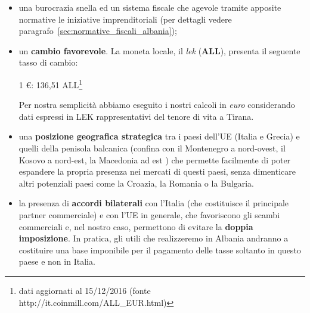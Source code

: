 \begin{itemize}
\item una burocrazia snella ed un sistema fiscale che agevole tramite apposite normative le iniziative imprenditoriali (per dettagli vedere paragrafo~\ref{sec:normative_fiscali_albania});
\item un \textbf{cambio favorevole}. La moneta locale, il \textit{lek} (\textbf{ALL}), presenta il seguente tasso di cambio:
	\begin{center}
		1 \euro : 136,51 ALL\footnote{dati aggiornati al 15/12/2016 (fonte http://it.coinmill.com/ALL\_EUR.html)}
	\end{center}
	
	\begin{tcolorbox}[colframe=blue!75!black,adjusted title=\textbf{Osservazione!}]
		Per nostra semplicità abbiamo eseguito i nostri calcoli in \textit{euro} considerando dati espressi in LEK rappresentativi del tenore di vita a Tirana.
	\end{tcolorbox}

\item una \textbf{posizione geografica strategica} tra i paesi dell'\ac{UE} (Italia e Grecia) e quelli della penisola balcanica (confina con il Montenegro a nord-ovest, il Kosovo a nord-est, la Macedonia ad est ) che permette facilmente di poter espandere la propria presenza nei mercati di questi paesi, senza dimenticare altri potenziali paesi come la Croazia, la Romania o la Bulgaria.
\item la presenza di \textbf{accordi bilaterali} con l'Italia (che costituisce il principale partner commerciale) e con l'\ac{UE} in generale, che favoriscono gli scambi commerciali e, nel nostro caso, permettono di evitare la \textbf{doppia imposizione}\cite{accordialbaniaitalia}. In pratica, gli utili che realizzeremo in Albania andranno a costituire una base imponibile per il pagamento delle tasse soltanto in questo paese e non in Italia.  
\end{itemize}  
